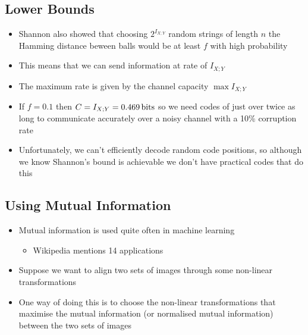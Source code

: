 
\begin{slide}
\section[-1]{Lower Bounds}
  
\begin{PauseHighLight}
  \begin{itemize}
  \item Shannon also showed that choosing  $2^{I_{X;Y}}$ random
    strings of length $n$ the Hamming distance beween balls would be
    at least $f$ with high probability\pause
  \item This means that we can send information at rate of
    $I_{X;Y}$\pause
  \item The maximum rate is given by the channel capacity $\max I_{X;Y}$\pause
  \item If $f=0.1$ then $C=I_{X;Y} = 0.469 \,\mathrm{bits}$ so we need codes of
    just over twice as long to communicate accurately over a noisy
    channel with a 10\% corruption rate\pause
  \item Unfortunately, we can't efficiently decode random code
    positions, so although we know Shannon's bound is achievable we
    don't have practical codes that do this\pause
  \end{itemize}
\end{PauseHighLight}

\end{slide}


\begin{slide}
\section{Using Mutual Information}

\begin{PauseHighLight}
  \begin{itemize}
  \item Mutual information is used quite often in machine
    learning\pause
    \begin{itemize}
    \item Wikipedia mentions 14 applications\pause
    \end{itemize}
  \item Suppose we want to align two sets of images through some non-linear
    transformations\pause
  \item One way of doing this is to choose the non-linear
    transformations that maximise the mutual information (or
    normalised mutual information) between the two sets of images\pause
  \end{itemize}
\end{PauseHighLight}

\end{slide}


